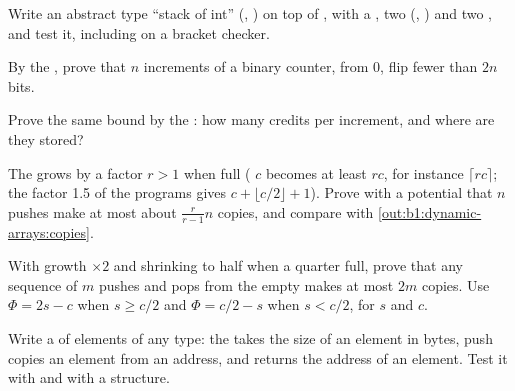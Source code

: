 \begin{exercise}[$\star\star$]\label{exo:b1:dynamic-arrays:7}
Write an abstract type ``stack of int'' (, ) on top of , with a , two
 (, ) and two , and test it, including on a bracket checker.
\end{exercise}

\begin{exercise}[$\star\star$]\label{exo:b1:dynamic-arrays:8}
By the , prove that $n$ increments of a binary counter, from 0, flip fewer than $2n$ bits.
\end{exercise}

\begin{exercise}[$\star\star$]\label{exo:b1:dynamic-arrays:9}
Prove the same bound by the : how many credits per increment, and where are they stored?
\end{exercise}

\begin{exercise}[$\star\star\star$]\label{exo:b1:dynamic-arrays:10}
The  grows by a factor $r > 1$ when full ( $c$ becomes at least $rc$, for
instance $\lceil rc \rceil$; the factor 1.5 of the programs gives $c + \lfloor c/2 \rfloor + 1$). Prove with a potential that $n$
pushes make at most about $\frac{r}{r - 1} n$ copies, and compare with \cref{out:b1:dynamic-arrays:copies}.
\end{exercise}

\begin{exercise}[$\star\star\star$]\label{exo:b1:dynamic-arrays:11}
With growth $\times 2$ and shrinking to half when a quarter full, prove that any sequence of $m$ pushes and pops from the
empty  makes at most $2m$ copies. Use $\Phi = 2s - c$ when $s \geq c/2$ and $\Phi = c/2 - s$ when $s < c/2$, for 
$s$ and  $c$.
\end{exercise}

\begin{exercise}[$\star\star\star$]\label{exo:b1:dynamic-arrays:12}
Write a  of elements of any type: the  takes the size of an element in bytes, push copies an
element from an address, and  returns the address of an element. Test it with  and with a
structure.
\end{exercise}

